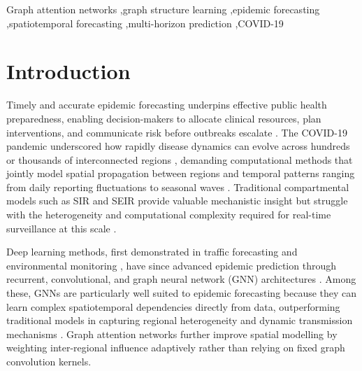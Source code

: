 \documentclass[a4paper,fleqn]{cas-dc}
\begin{document}
\begin{keywords}
  Graph attention networks \sep graph structure learning \sep epidemic forecasting \sep spatiotemporal forecasting \sep multi-horizon prediction \sep COVID-19
  \end{keywords}

\maketitle

\section{Introduction}
\label{sec:introduction}

Timely and accurate epidemic forecasting underpins effective public health preparedness, enabling decision-makers to allocate clinical resources, plan interventions, and communicate risk before outbreaks escalate \cite{DEANGELIS201583, Brooks2018Nonmechanistic}. The COVID-19 pandemic underscored how rapidly disease dynamics can evolve across hundreds or thousands of interconnected regions \cite{ajao2023deep, da2021covid, giuliani2020modelling, verma2022temporal, ma2024reporting}, demanding computational methods that jointly model spatial propagation between regions and temporal patterns ranging from daily reporting fluctuations to seasonal waves \cite{Panja2022Epicasting, Stone2007Seasonal}. Traditional compartmental models such as SIR and SEIR provide valuable mechanistic insight but struggle with the heterogeneity and computational complexity required for real-time surveillance at this scale \cite{heltberg2022spatial, s25082507, DEANGELIS201583}.

Deep learning methods, first demonstrated in traffic forecasting \cite{li2017diffusion, zhang2021graph} and environmental monitoring \cite{wu2018deep, lai2018modeling}, have since advanced epidemic prediction through recurrent, convolutional, and graph neural network (GNN) architectures \cite{ajao2023deep, zhiweidingBiologyInformedRecurrentNeural2023, Ahmadini2025, Kamalov2022ReviewDL, wang2019defsi}. Among these, GNNs are particularly well suited to epidemic forecasting because they can learn complex spatiotemporal dependencies directly from data, outperforming traditional models in capturing regional heterogeneity and dynamic transmission mechanisms \cite{kimForecastingEpidemicSpread2025, lijingwangCausalGNNCausalBasedGraph2022, gao2021stan}. Graph attention networks \cite{velickovic2017graph} further improve spatial modelling by weighting inter-regional influence adaptively rather than relying on fixed graph convolution kernels.
\end{document}
